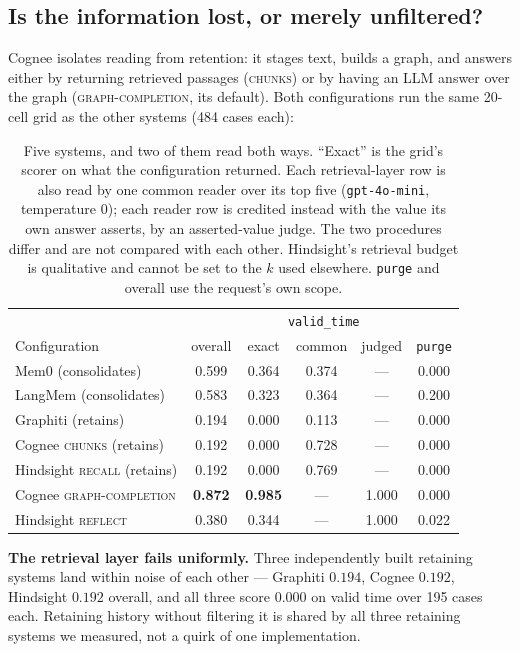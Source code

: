 \documentclass[conference]{IEEEtran}
\begin{document}
\subsection{Is the information lost, or merely unfiltered?}
\label{sec:reader}

Cognee isolates reading from retention: it stages text, builds a graph, and
answers either by
returning retrieved passages (\textsc{chunks}) or by having an LLM answer over
the graph (\textsc{graph-completion}, its default). Both configurations run the
same 20-cell grid as the other systems (484 cases each):

\begin{table}[t]
\centering
\caption{Five systems, and two of them read both ways. ``Exact'' is the grid's
scorer on what the configuration returned. Each retrieval-layer row is also read
by one common reader over its top five (\texttt{gpt-4o-mini}, temperature 0);
each reader row is credited instead with the value its own answer asserts, by an
asserted-value judge. The two procedures differ and are not compared with each
other. Hindsight's retrieval budget is qualitative and cannot be set to the $k$
used elsewhere. \texttt{purge} and overall use the request's own scope.}
\label{tab:reader}
\footnotesize
\setlength{\tabcolsep}{2.4pt}
\begin{tabular}{@{}lccccc@{}}
\toprule
 & & \multicolumn{3}{c}{\texttt{valid\_time}} & \\
Configuration & overall & exact & common & judged & \texttt{purge} \\
\midrule
Mem0 (consolidates)              & 0.599 & 0.364 & 0.374 & --- & 0.000 \\
LangMem (consolidates)           & 0.583 & 0.323 & 0.364 & --- & 0.200 \\
Graphiti (retains)               & 0.194 & 0.000 & 0.113 & --- & 0.000 \\
Cognee \textsc{chunks} (retains) & 0.192 & 0.000 & 0.728 & --- & 0.000 \\
Hindsight \textsc{recall} (retains) & 0.192 & 0.000 & 0.769 & --- & 0.000 \\
\midrule
Cognee \textsc{graph-completion} & \textbf{0.872} & \textbf{0.985} & --- & 1.000 & 0.000 \\
Hindsight \textsc{reflect}       & 0.380 & 0.344 & --- & 1.000 & 0.022 \\
\bottomrule
\end{tabular}
\end{table}

\textbf{The retrieval layer fails uniformly.} Three independently built
retaining systems land within noise of each other --- Graphiti $0.194$, Cognee
$0.192$, Hindsight $0.192$ overall, and all three score $0.000$ on valid time
over 195 cases each. Retaining history without filtering it is shared by all
three retaining systems we measured, not a quirk of one implementation.
\end{document}
